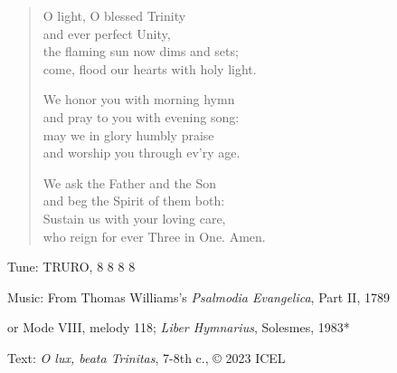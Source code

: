 \hymn

\begin{verse}
O light, O blessed Trinity\\
and ever perfect Unity,\\
the flaming sun now dims and sets;\\
come, flood our hearts with holy light.

We honor you with morning hymn\\
and pray to you with evening song:\\
may we in glory humbly praise\\
and worship you through ev’ry age.

We ask the Father and the Son\\
and beg the Spirit of them both:\\
Sustain us with your loving care,\\
who reign for ever Three in One. Amen.
\end{verse}

\begin{hymnsource}
Tune: TRURO, 8 8 8 8

Music: From Thomas Williams’s \emph{Psalmodia Evangelica}, Part II, 1789

or Mode VIII, melody 118; \emph{Liber Hymnarius}, Solesmes, 1983*

Text: \emph{O lux, beata Trinitas}, 7-8th c., © 2023 ICEL
\end{hymnsource}